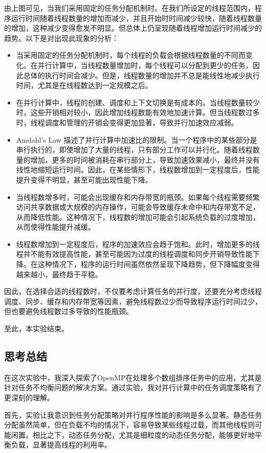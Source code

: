 \documentclass{nku}
\begin{document}
由上图可见，当我们采用固定的任务分配机制时。在我们所设定的线程范围内，程序运行时间随着线程数量的增加而减少，并且开始时时间减少较快，随着线程数量的增加，这种减少变得愈发不明显。但总体上仍呈现随着线程增加运行时间减少的趋势。以下是对出现此现象的分析：
\begin{itemize}
    \item 当采用固定的任务分配机制时，每个线程的负载会根据线程数量的不同而变化。在并行计算中，当线程数量增加时，每个线程可以分配到更少的任务，因此总体的执行时间会减少。但是，线程数量的增加并不总是能线性地减少执行时间，尤其是在线程数达到一定规模之后。
    \item 在并行计算中，线程的创建、调度和上下文切换是有成本的。当线程数量较少时，这些开销相对较小，因此增加线程数能有效地加速计算。但当线程数过多时，线程调度和管理的开销会变得更加显著，导致并行加速效应减弱。
    \item Amdahl’s Law 描述了并行计算中加速比的限制。当一个程序中的某些部分是串行执行的，即使增加了大量的线程，只有部分工作可以并行化。随着线程数量的增加，更多的时间被消耗在串行部分上，导致加速效果减小，最终并没有线性地缩短运行时间。因此，在某些情形下，线程数增加到一定程度后，性能提升变得不明显，甚至可能出现性能下降。
    \item 当线程数增多时，可能会出现缓存和内存带宽的瓶颈。如果每个线程需要频繁访问共享数据或大规模的内存操作，可能会导致缓存未命中和内存带宽不足，从而降低性能。这种情况下，线程数的增加可能会引起系统负载的过度增加，从而使得性能提升减缓。
    \item 线程数增加到一定程度后，程序的加速效应会趋于饱和。此时，增加更多的线程并不能有效提高性能，甚至可能因为过度的线程调度和同步开销导致性能下降。在这种情况下，程序的运行时间虽然依然呈现下降趋势，但下降幅度变得越来越小，最终趋于平稳。
\end{itemize}

因此，在选择合适的线程数时，不仅要考虑计算任务的并行度，还要充分考虑线程调度、同步、缓存和内存带宽等因素，避免线程数过少而导致程序运行时间过少，但也要避免线程数过多导致的性能瓶颈。

至此，本实验结束。

\subsection{思考总结}
在这次实验中，我深入探索了OpenMP在处理多个数组排序任务中的应用，尤其是针对任务不均衡问题的解决方案。通过实验，我对并行计算中的任务调度策略有了更深刻的理解。

首先，实验让我意识到任务分配策略对并行程序性能的影响是多么显著。静态任务分配虽然简单，但在负载不均的情况下，容易导致某些线程过载，而其他线程则可能闲置。相比之下，动态任务分配，尤其是细粒度的动态任务分配，能够更好地平衡负载，显著提高线程的利用率。
\end{document}
